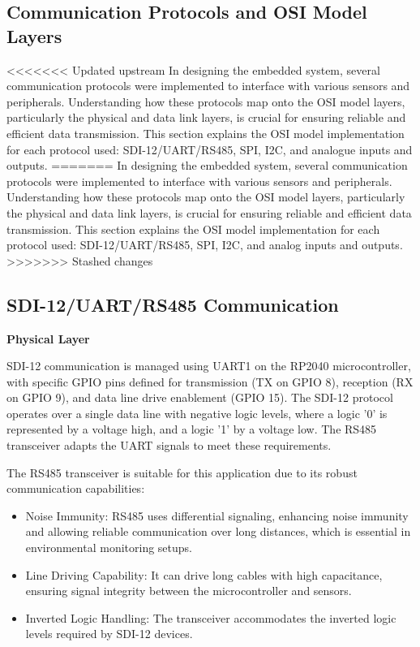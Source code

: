 \subsection{Communication Protocols and OSI Model Layers}

<<<<<<< Updated upstream
In designing the embedded system, several communication protocols were implemented to interface with various sensors and peripherals. Understanding how these protocols map onto the OSI model layers, particularly the physical and data link layers, is crucial for ensuring reliable and efficient data transmission. This section explains the OSI model implementation for each protocol used: SDI-12/UART/RS485, SPI, I2C, and analogue inputs and outputs.
=======
In designing the embedded system, several communication protocols were implemented 
to interface with various sensors and peripherals. Understanding how these protocols 
map onto the OSI model layers, particularly the physical and data link layers, is 
crucial for ensuring reliable and efficient data transmission. This section explains 
the OSI model implementation for each protocol used: SDI-12/UART/RS485, SPI, I2C, 
and analog inputs and outputs.
>>>>>>> Stashed changes

\subsection{SDI-12/UART/RS485 Communication}
\textbf{Physical Layer}

SDI-12 communication is managed using UART1 on the RP2040 microcontroller, with specific 
GPIO pins defined for transmission (TX on GPIO 8), reception (RX on GPIO 9), and data 
line drive enablement (GPIO 15). The SDI-12 protocol operates over a single data line 
with negative logic levels, where a logic '0' is represented by a voltage high, and a 
logic '1' by a voltage low. The RS485 transceiver adapts the UART signals to meet these requirements.

The RS485 transceiver is suitable for this application due to its robust communication capabilities:

\begin{itemize}
    \item Noise Immunity: RS485 uses differential signaling, enhancing noise immunity and allowing 
    reliable communication over long distances, which is essential in environmental monitoring setups.
    \item Line Driving Capability: It can drive long cables with high capacitance, ensuring signal 
    integrity between the microcontroller and sensors.
    \item Inverted Logic Handling: The transceiver accommodates the inverted logic levels required by SDI-12 devices.
\end{itemize}

